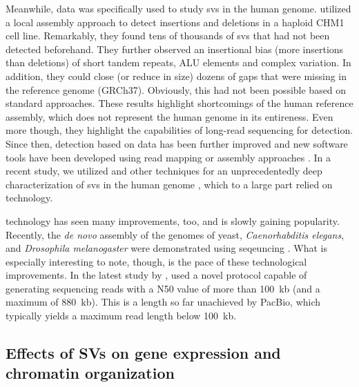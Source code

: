 Meanwhile, \pacbio \wgs data was specifically used to study \acp{sv} in the
human genome. \citet{Chaisson2014} utilized a local assembly approach to detect
insertions and deletions in a haploid CHM1 cell line. Remarkably, they found
tens of thousands of \acp{sv} that had not been detected beforehand. They further
observed an insertional bias (more insertions than deletions) of short tandem
repeats, ALU elements and complex variation. In addition, they could close (or
reduce in size) dozens of gaps that were missing in the reference genome
(GRCh37). Obviously, this had not been possible based on standard \mps
approaches. These results highlight shortcomings of the human reference assembly,
which does not represent the human genome in its entireness. Even more though,
they highlight the capabilities of long-read sequencing for \sv detection.
Since then, \sv detection based on \pacbio data has been further improved and
new software tools have been developed using read mapping or assembly approaches
\citep{Pendleton2015,Huddleston2017}. In a recent study, we utilized \pacbio and
other techniques for an unprecedentedly deep characterization of \acp{sv} in
the human genome \citep{Chaisson2017}, which to a large part relied on \pacbio
technology.

\ont technology has seen many improvements, too, and is slowly gaining
popularity. Recently, the \textit{de novo} assembly of the genomes of yeast,
\textit{Caenorhabditis elegans}, and \textit{Drosophila melanogaster} were
demonstrated using \ont seqeuncing \citep{Istace2017,Tyson2017,Solares2018}.
What is especially interesting to note, though, is the pace of these technological
improvements. In the latest study by \ont, \citet{Jain2018} used a novel protocol
capable of generating sequencing reads with a N50 value of more than 100~kb
(and a maximum of 880~kb). This is a length so far unachieved by PacBio, which
typically yields a maximum read length below 100~kb.





\subsection{Effects of SVs on gene expression and chromatin organization}

